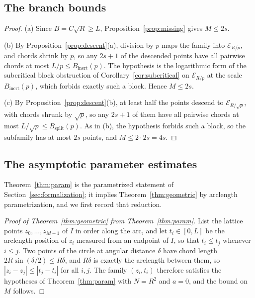 \documentclass[11pt]{article}
\newcommand{\E}{\mathcal E}
\begin{document}
\subsection{The branch bounds}
\label{app:branches}

\branchbounds*

\begin{proof}
(a) Since \(B=C\sqrt R\ge L\), Proposition~\ref{prop:missing} gives \(M\le 2s\).

(b) By Proposition~\ref{prop:descent}(a), division by \(p\) maps the family into \(\E_{R/p}\), and chords shrink by \(p\), so any \(2s+1\) of the descended points have all pairwise chords at most \(L/p\le B_{\mathrm{inert}}(p)\).
The hypothesis is the logarithmic form of the subcritical block obstruction of Corollary~\ref{cor:subcritical} on \(\E_{R/p}\) at the scale \(B_{\mathrm{inert}}(p)\), which forbids exactly such a block.
Hence \(M\le 2s\).

(c) By Proposition~\ref{prop:descent}(b), at least half the points descend to \(\E_{R/\sqrt p}\), with chords shrunk by \(\sqrt p\), so any \(2s+1\) of them have all pairwise chords at most \(L/\sqrt p\le B_{\mathrm{split}}(p)\).
As in (b), the hypothesis forbids such a block, so the subfamily has at most \(2s\) points, and \(M\le 2\cdot 2s=4s\).
\end{proof}

\subsection{The asymptotic parameter estimates}
\label{app:asymptotic}

Theorem~\ref{thm:param} is the parametrized statement of Section~\ref{sec:formalization}; it implies Theorem~\ref{thm:geometric} by arclength parametrization, and we first record that reduction.

\geometricthm*

\begin{proof}[Proof of Theorem~\ref{thm:geometric} from Theorem~\ref{thm:param}]
List the lattice points \(z_0,\dots,z_{M-1}\) of \(I\) in order along the arc, and let \(t_i\in[0,L]\) be the arclength position of \(z_i\) measured from an endpoint of \(I\), so that \(t_i\le t_j\) whenever \(i\le j\).
Two points of the circle at angular distance \(\delta\) have chord length \(2R\sin(\delta/2)\le R\delta\), and \(R\delta\) is exactly the arclength between them, so \(|z_i-z_j|\le|t_j-t_i|\) for all \(i,j\).
The family \((z_i,t_i)\) therefore satisfies the hypotheses of Theorem~\ref{thm:param} with \(N=R^2\) and \(a=0\), and the bound on \(M\) follows.
\end{proof}
\end{document}
